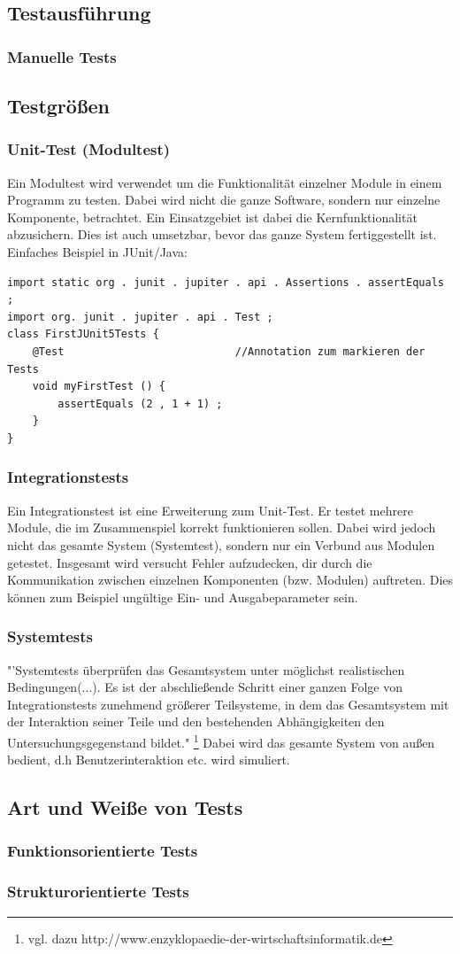 \documentclass[a4paper,10pt]{scrartcl}
\begin{document}
\newpage
\subsection{Testausführung}
\subsubsection{Manuelle Tests}
\subsection{Testgrößen}
\subsubsection{Unit-Test (Modultest)}
Ein Modultest wird verwendet um die Funktionalität einzelner Module in einem Programm zu testen. Dabei wird nicht die ganze Software, sondern nur einzelne Komponente, betrachtet. Ein Einsatzgebiet ist dabei die Kernfunktionalität abzusichern. Dies ist auch umsetzbar, bevor das ganze System fertiggestellt ist.\\
Einfaches Beispiel in JUnit/Java:
\begin{lstlisting}
import static org . junit . jupiter . api . Assertions . assertEquals ;
import org. junit . jupiter . api . Test ;
class FirstJUnit5Tests {
	@Test 							//Annotation zum markieren der Tests
	void myFirstTest () {
		assertEquals (2 , 1 + 1) ;
	}
}
\end{lstlisting}
\subsubsection{Integrationstests}
Ein Integrationstest ist eine Erweiterung zum Unit-Test. Er testet mehrere Module, die im Zusammenspiel korrekt funktionieren sollen. Dabei wird jedoch nicht das gesamte System (Systemtest), sondern nur ein Verbund aus Modulen getestet. Insgesamt wird versucht Fehler aufzudecken, dir durch die Kommunikation zwischen einzelnen Komponenten (bzw. Modulen) auftreten. Dies können zum Beispiel ungültige Ein- und Ausgabeparameter sein.
\subsubsection{Systemtests}
"'Systemtests überprüfen das Gesamtsystem unter möglichst realistischen Bedingungen(...). Es ist der abschließende Schritt einer ganzen Folge von Integrationstests zunehmend größerer Teilsysteme, in dem das Gesamtsystem mit der Interaktion seiner Teile und den bestehenden Abhängigkeiten den Untersuchungsgegenstand bildet."
\footnote{vgl. dazu http://www.enzyklopaedie-der-wirtschaftsinformatik.de} 
Dabei wird das gesamte System von außen bedient, d.h Benutzerinteraktion etc. wird simuliert.
\subsection{Art und Weiße von Tests}
\subsubsection{Funktionsorientierte Tests}

\subsubsection{Strukturorientierte Tests}
\end{document}

